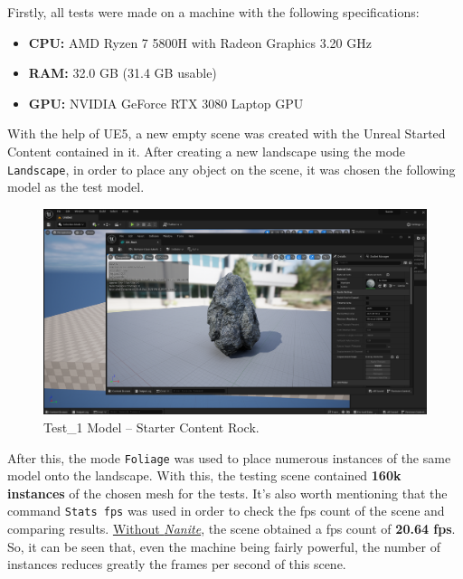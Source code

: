 \documentclass[10pt,journal,compsoc]{IEEEtran}
\begin{document}
\par Firstly, all tests were made on a machine with the following specifications:

\begin{itemize}
    \item \textbf{CPU:} AMD Ryzen 7 5800H with Radeon Graphics 3.20 GHz
    \item \textbf{RAM:} 32.0 GB (31.4 GB usable)
    \item \textbf{GPU:} NVIDIA GeForce RTX 3080 Laptop GPU
\end{itemize}

\par With the help of UE5, a new empty scene was created with the Unreal Started Content contained in it. After creating a new landscape using the mode \texttt{Landscape}, in order to place any object on the scene, it was chosen the following model as the test model.

\begin{figure}[H]
    \centering
    \includegraphics[scale=0.16]{img/rock.png}
    \caption{Test\_1 Model – Starter Content Rock.}
    \label{fig:rock}
\end{figure}

\par After this, the mode \texttt{Foliage} was used to place numerous instances of the same model onto the landscape. With this, the testing scene contained \textbf{160k instances} of the chosen mesh for the tests. It's also worth mentioning that the command \texttt{Stats fps} was used in order to check the fps count of the scene and comparing results. \underline{Without \textit{Nanite}}, the scene obtained a fps count of \textbf{20.64 fps}. So, it can be seen that, even the machine being fairly powerful,  the number of instances reduces greatly the frames per second of this scene.
\end{document}
